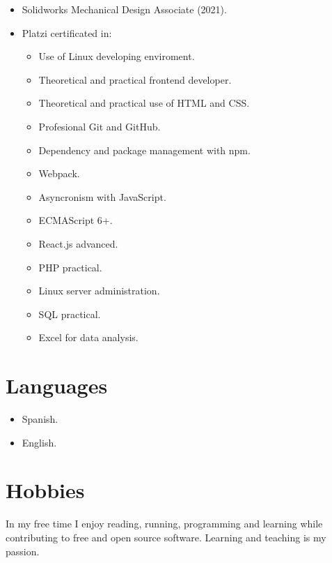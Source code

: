 \documentclass{article}
\begin{document}
  \begin{itemize}
    \item Solidworks Mechanical Design Associate (2021).
    \item Platzi certificated in:

      \begin{multicols}{2}
      \begin{itemize}
        \item Use of Linux developing enviroment.
        \item Theoretical and practical frontend developer.
        \item Theoretical and practical use of HTML and CSS\@.
        \item Profesional Git and GitHub.
        \item Dependency and package management with npm.
        \item Webpack.
        \item Asyncronism with JavaScript.
        \item ECMAScript 6+.
        \item React.js advanced.
        \item PHP practical.
        \item Linux server administration.
        \item SQL practical.
        \item Excel for data analysis.
      \end{itemize}
      \end{multicols}
  \end{itemize}%


  \section{Languages}%

  \begin{itemize}
    \item Spanish.
    \item English.
  \end{itemize}%


  \section{Hobbies}%

  In my free time I enjoy reading, running, programming and learning while contributing to free and open source software. Learning and teaching is my passion.%
\end{document}
